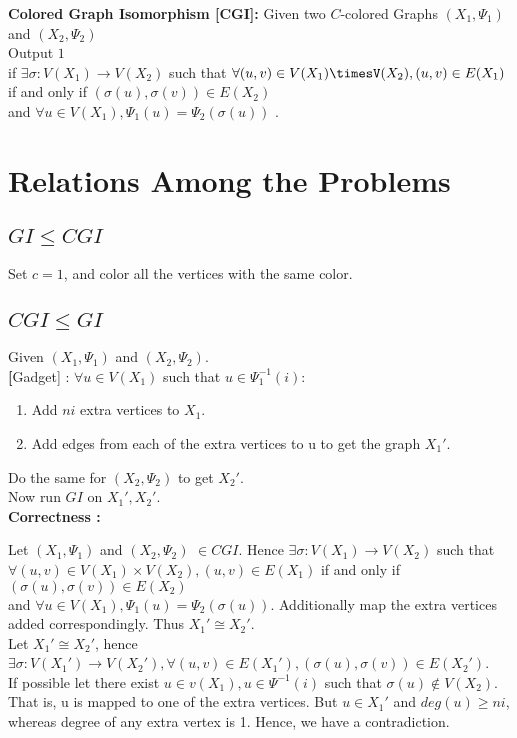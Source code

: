 \textbf{Colored Graph Isomorphism [CGI]:} Given two $C$-colored Graphs $(X_1,\Psi_1)$ and $(X_2,\Psi_2)$\\
Output $1$ \\
if $\exists \sigma : V(X_1) \rightarrow V(X_2)$ such that 
$\forall (u,v) \in V(X_1)\timesV(X_2), (u,v) \in E(X_1)$ if and only if $(\sigma(u), \sigma(v)) \in E(X_2) $\\
 and $\forall u \in V(X_1) , \Psi_1(u) = \Psi_2(\sigma(u))$ .

\section{Relations Among the Problems}

\subsection{$GI \le CGI$}
	Set $c=1$, and color all the vertices with the same color.

\subsection{$CGI \le GI$}
Given $(X_1,\Psi_1)$ and $(X_2,\Psi_2)$.\\
\textbf[Gadget] : $\forall u \in V(X_1)$ such that $u \in \Psi_1^{-1}(i)$:
\begin{enumerate}
\item Add $ni$ extra vertices to $X_1$.
\item Add edges from each of the extra vertices to u to get the graph $X_1'$.
\end{enumerate}
Do the same for $(X_2,\Psi_2)$ to get $X_2'$.\\
Now run $GI$ on $X_1',X_2'$.\\

\textbf{Correctness :}

Let $(X_1,\Psi_1)$ and $(X_2,\Psi_2)$ $\in CGI$. Hence $\exists \sigma : V(X_1) \rightarrow V(X_2)$ such that 
$\forall (u,v) \in V(X_1)\times V(X_2), (u,v) \in E(X_1)$ if and only if $(\sigma(u), \sigma(v)) \in E(X_2) $\\
 and $\forall u \in V(X_1) , \Psi_1(u) = \Psi_2(\sigma(u))$. Additionally map the extra vertices added correspondingly. Thus $X_1' \cong X_2'$.
\\

Let $X_1' \cong X_2'$, hence $ \exists \sigma : V(X_1') \rightarrow V(X_2'), \forall (u,v) \in E(X_1'), (\sigma(u),\sigma(v)) \in E(X_2')$.\\
If possible let there exist $ u \in v(X_1), u \in \Psi^{-1}(i)$ such that $\sigma(u) \notin V(X_2)$. That is, u is mapped to one of the extra vertices. But $u \in X_1'$ and $deg(u) \ge ni$, whereas degree of any extra vertex is 1. Hence, we have a contradiction.\\

